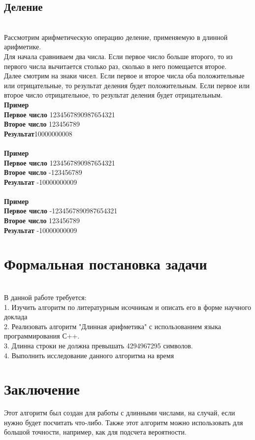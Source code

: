 \documentclass[a4paper]{article}
\begin{document}
\subsection{Деление}
\\Рассмотрим арифметическую операцию деление, применяемую в длинной арифметике.
\\Для начала сравниваем два числа. Если первое число больше второго, то из первого числа вычитается столько раз, сколько в него помещается второе.
\\Далее смотрим на знаки чисел. Если первое и второе числа оба положительные или отрицательные, то результат деления будет положительным. Если первое или второе число отрицательное, то результат деления будет отрицательным.
\\ \textbf{Пример}
\\ \textbf{Первое число} 1234567890987654321
\\ \textbf{Второе число} 123456789
\\ \textbf{Результат}10000000008
\\
\\ \textbf{Пример}
\\ \textbf{Первое число} 1234567890987654321
\\ \textbf{Второе число} -123456789
\\ \textbf{Результат} -10000000009
\\
\\ \textbf{Пример}
\\ \textbf{Первое число} -1234567890987654321
\\ \textbf{Второе число} 123456789
\\ \textbf{Результат} -10000000009

\newpage

\section{Формальная постановка задачи}
\\В данной работе требуется:
\\1. Изучить алгоритм по литературным исочникам и описать его в форме научного доклада
\\2. Реализовать алгоритм "Длинная арифметика" с использованием языка программирования С++.
\\3. Длинна строки не должна превышать 4294967295 символов.
\\4. Выполнить исследование данного алгоритма на время
\newpage


\section{Заключение}
Этот алгоритм был создан для работы с длинными числами, на случай, если нужно будет посчитать что-либо. Также этот алгоритм можно использовать для большой точности, например, как для подсчета вероятности.
\newpage


\end{document}
